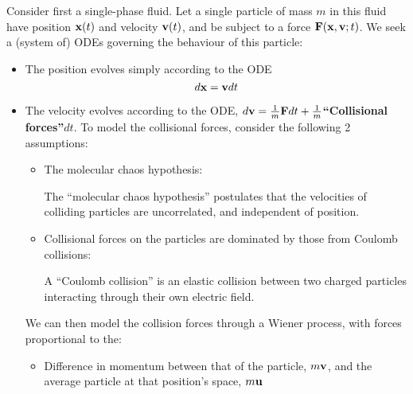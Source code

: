         Consider first a single-phase fluid. Let a single particle of mass $m$ in this fluid have position $\mathbf{x}(t)$ and velocity $\mathbf{v}(t)$, and be subject to a force $\mathbf{F}(\mathbf{x}, \mathbf{v}; t)$. We seek a (system of) ODEs governing the behaviour of this particle:
        \begin{itemize}
            \item  The position evolves simply according to the ODE
            \begin{equation}\label{velocity ODE}
                d\mathbf{x}  =  \mathbf{v} dt
            \end{equation}
            \item  The velocity evolves according to the ODE, $d\mathbf{v}  =  \frac{1}{m}\mathbf{F} dt + \frac{1}{m}${\bf ``Collisional forces''}$dt$.  To model the collisional forces, consider the following 2 assumptions:
            \begin{itemize}
                \item  The molecular chaos hypothesis:
                \begin{definition}
                    The ``molecular chaos hypothesis'' postulates that the velocities of colliding particles are uncorrelated, and independent of position. \BA{[Ref]} 
                \end{definition}
                \item  Collisional forces on the particles are dominated by those from Coulomb collisions: 
                \begin{definition}
                    A ``Coulomb collision'' is an elastic collision between two charged particles interacting through their own electric field. \BA{[Ref]} 
                \end{definition}
            \end{itemize}
            We can then model the collision forces through a Wiener process, with forces proportional to the:  
            \begin{itemize}
                \item  Difference in momentum between that of the particle, $m\mathbf{v}$, and the average particle at that position's space, $m\mathbf{u}$ 

\end{itemize}
\end{itemize}
